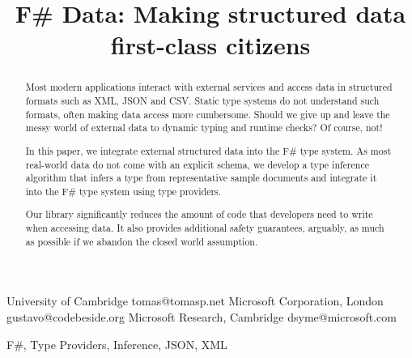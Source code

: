 \documentclass[10pt,preprint,blind,clearpagebib]{sigplanconf}
\newcommand{\doi}[1]{doi:~\href{http://dx.doi.org/#1}{\Hurl{#1}}}
\begin{document}
\setlength{\pdfpageheight}{\paperheight}
\setlength{\pdfpagewidth}{\paperwidth}


\title{F\# Data: \textnormal{Making structured data first-class citizens}}

           {University of Cambridge}
           {tomas@tomasp.net}
           {Microsoft Corporation, London}
           {gustavo@codebeside.org}
           {Microsoft Research, Cambridge}
           {dsyme@microsoft.com}
\maketitle


\begin{abstract}
Most modern applications interact with external services and access data in structured formats such 
as XML, JSON and CSV. Static type systems do not understand such formats, often making data access
more cumbersome. Should we give up and leave the messy world of external data to dynamic typing 
and runtime checks? Of course, not!

In this paper, we integrate external structured data into the F\# type system. As most real-world data
do not come with an explicit schema, we develop a type inference algorithm that infers a type from 
representative sample documents and integrate it into the F\# type system using type providers.

Our library significantly reduces the amount of code that developers need to write when 
accessing data. It also provides additional safety guarantees, arguably, as much as possible if 
we abandon the closed world assumption.
\end{abstract}

\keywords F\#, Type Providers, Inference, JSON, XML
\end{document}
